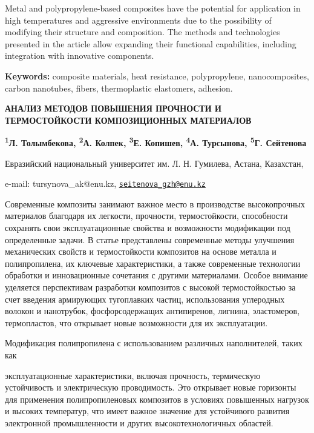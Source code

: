 Metal and polypropylene-based composites have the potential for
application in high temperatures and aggressive environments due to the
possibility of modifying their structure and composition. The methods
and technologies presented in the article allow expanding their
functional capabilities, including integration with innovative
components.

{\bfseries Keywords:} composite materials, heat resistance, polypropylene,
nanocomposites, carbon nanotubes, fibers, thermoplastic elastomers,
adhesion.

\begin{articleheader}
{\bfseries АНАЛИЗ МЕТОДОВ ПОВЫШЕНИЯ ПРОЧНОСТИ И ТЕРМОСТОЙКОСТИ
КОМПОЗИЦИОННЫХ МАТЕРИАЛОВ}

{\bfseries
\textsuperscript{1}Л. Толымбекова,
\textsuperscript{2}А. Колпек,
\textsuperscript{3}Е. Копишев,
\textsuperscript{4}А. Турсынова\textsuperscript{\envelope },
\textsuperscript{5}Г. Сейтенова\textsuperscript{\envelope }
}
\end{articleheader}

\begin{affiliation}
Евразийский национальный университет им. Л. Н. Гумилева, Астана, Казахстан,

e-mail: tursynova\_ak@enu.kz, \href{mailto:seitenova_gzh@enu.kz}{\nolinkurl{seitenova\_gzh@enu.kz}}
\end{affiliation}

Современные композиты занимают важное место в производстве высокопрочных
материалов благодаря их легкости, прочности, термостойкости, способности
сохранять свои эксплуатационные свойства и возможности модификации под
определенные задачи. В статье представлены современные методы улучшения
механических свойств и термостойкости композитов на основе металла и
полипропилена, их ключевые характеристики, а также современные
технологии обработки и инновационные сочетания с другими материалами.
Особое внимание уделяется перспективам разработки композитов с высокой
термостойкостью за счет введения армирующих тугоплавких частиц,
использования углеродных волокон и нанотрубок, фосфорсодержащих
антипиренов, лигнина, эластомеров, термопластов, что открывает новые
возможности для их эксплуатации.

Модификация полипропилена с использованием различных наполнителей, таких
как

эксплуатационные характеристики, включая прочность, термическую
устойчивость и электрическую проводимость. Это открывает новые горизонты
для применения полипропиленовых композитов в условиях повышенных
нагрузок и высоких температур, что имеет важное значение для устойчивого
развития электронной промышленности и других высокотехнологичных
областей.

